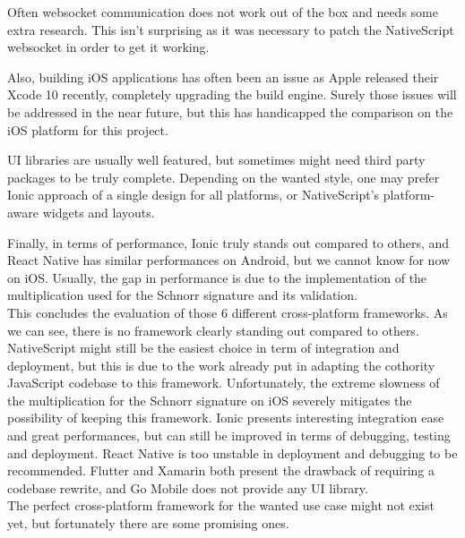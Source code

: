 \documentclass[11pt, a4paper, twoside, openright]{article} %
\begin{document}
{Often websocket communication does not work out of the box and needs some extra research. This isn't surprising as it was necessary to patch the NativeScript websocket in order to get it working.

Also, building iOS applications has often been an issue as Apple released their Xcode 10 recently, completely upgrading the build engine. Surely those issues will be addressed in the near future, but this has handicapped the comparison on the iOS platform for this project.

UI libraries are usually well featured, but sometimes might need third party packages to be truly complete. Depending on the wanted style, one may prefer Ionic approach of a single design for all platforms, or NativeScript's platform-aware widgets and layouts.

Finally, in terms of performance, Ionic truly stands out compared to others, and React Native has similar performances on Android, but we cannot know for now on iOS. Usually, the gap in performance is due to the implementation of the multiplication used for the Schnorr signature and its validation.\\

This concludes the evaluation of those 6 different cross-platform frameworks. As we can see, there is no framework clearly standing out compared to others. NativeScript might still be the easiest choice in term of integration and deployment, but this is due to the work already put in adapting the cothority JavaScript codebase to this framework. Unfortunately, the extreme slowness of the multiplication for the Schnorr signature on iOS severely mitigates the possibility of keeping this framework.
Ionic presents interesting integration ease and great performances, but can still be improved in terms of debugging, testing and deployment. React Native is too unstable in deployment and debugging to be recommended.
 Flutter and Xamarin both present the drawback of requiring a codebase rewrite, and Go Mobile does not provide any UI library.\\
 
 The perfect cross-platform framework for the wanted use case might not exist yet, but fortunately there are some promising ones.

\newpage
\appendix
}
\end{document}
